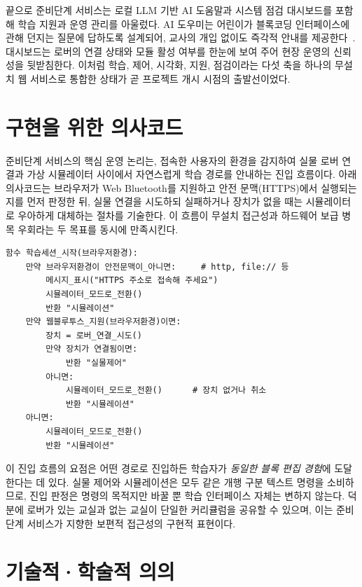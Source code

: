 끝으로 준비단계 서비스는 로컬 LLM 기반 AI 도움말과 시스템 점검 대시보드를 포함해 학습 지원과 운영 관리를 아울렀다. AI 도우미는 어린이가 블록코딩 인터페이스에 관해 던지는 질문에 답하도록 설계되어, 교사의 개입 없이도 즉각적 안내를 제공한다~\cite{exaone35, transformers}. 대시보드는 로버의 연결 상태와 모듈 활성 여부를 한눈에 보여 주어 현장 운영의 신뢰성을 뒷받침한다. 이처럼 학습, 제어, 시각화, 지원, 점검이라는 다섯 축을 하나의 무설치 웹 서비스로 통합한 상태가 곧 프로젝트 개시 시점의 출발선이었다.

\section{구현을 위한 의사코드}

준비단계 서비스의 핵심 운영 논리는, 접속한 사용자의 환경을 감지하여 실물 로버 연결과 가상 시뮬레이터 사이에서 자연스럽게 학습 경로를 안내하는 진입 흐름이다. 아래 의사코드는 브라우저가 Web Bluetooth를 지원하고 안전 문맥(HTTPS)에서 실행되는지를 먼저 판정한 뒤, 실물 연결을 시도하되 실패하거나 장치가 없을 때는 시뮬레이터로 우아하게 대체하는 절차를 기술한다. 이 흐름이 무설치 접근성과 하드웨어 보급 병목 우회라는 두 목표를 동시에 만족시킨다.

\begin{verbatim}
함수 학습세션_시작(브라우저환경):
    만약 브라우저환경이 안전문맥이_아니면:     # http, file:// 등
        메시지_표시("HTTPS 주소로 접속해 주세요")
        시뮬레이터_모드로_전환()
        반환 "시뮬레이션"
    만약 웹블루투스_지원(브라우저환경)이면:
        장치 = 로버_연결_시도()
        만약 장치가 연결됨이면:
            반환 "실물제어"
        아니면:
            시뮬레이터_모드로_전환()      # 장치 없거나 취소
            반환 "시뮬레이션"
    아니면:
        시뮬레이터_모드로_전환()
        반환 "시뮬레이션"
\end{verbatim}

이 진입 흐름의 요점은 어떤 경로로 진입하든 학습자가 \emph{동일한 블록 편집 경험}에 도달한다는 데 있다. 실물 제어와 시뮬레이션은 모두 같은 개행 구분 텍스트 명령을 소비하므로, 진입 판정은 명령의 목적지만 바꿀 뿐 학습 인터페이스 자체는 변하지 않는다. 덕분에 로버가 있는 교실과 없는 교실이 단일한 커리큘럼을 공유할 수 있으며, 이는 준비단계 서비스가 지향한 보편적 접근성의 구현적 표현이다.

\section{기술적·학술적 의의}


